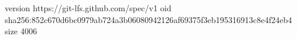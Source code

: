 version https://git-lfs.github.com/spec/v1
oid sha256:852c670d6bc0979ab724a3b06080942126af69375f3eb195316913c8e4f24eb4
size 4006

